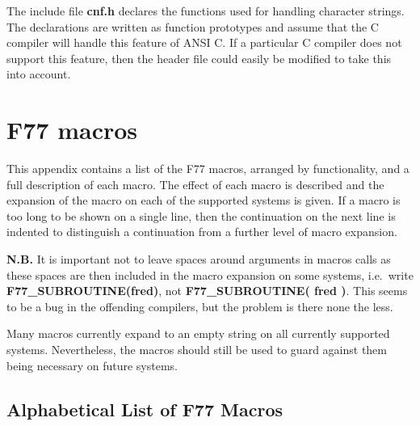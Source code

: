 The include file {\bf cnf.h} declares the functions used for handling character
strings. The declarations are written as function prototypes and assume that
the C compiler will handle this feature of ANSI C. If a particular C compiler
does not support this feature, then the header file could easily be modified to
take this into account.

\newpage

\section{F77 macros}
\label{f77:description}

This appendix contains a list of the F77 macros, arranged by functionality, and
a full description of each macro. The effect of each macro is described and the
expansion of the macro on each of the supported systems is given. If a macro is
too long to be shown on a single line, then the continuation on the next line
is indented to distinguish a continuation from a further level of macro
expansion.

{\bf N.B.} It is important not to leave spaces around arguments in macros calls
as these spaces are then included in the macro expansion on some systems, i.e.\
write {\bf F77\_\-SUBROUTINE(fred)}, not {\bf F77\_\-SUBROUTINE( fred )}. This
seems to be a bug in the offending compilers, but the problem is there none the
less.

Many macros currently expand to an empty string on all currently supported
systems. Nevertheless, the macros should still be used to guard against them
being necessary on future systems.

\subsection{Alphabetical List of F77 Macros}

